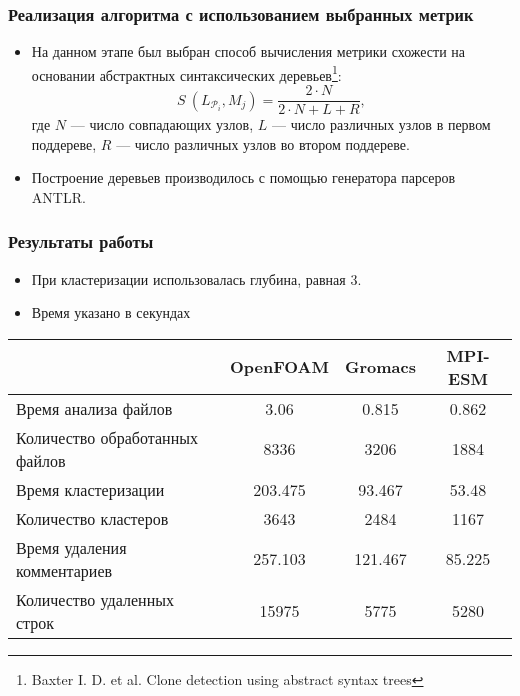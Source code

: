 \documentclass{beamer}
\begin{document}
\begin{frame}
\frametitle{Реализация алгоритма с использованием выбранных метрик}
\begin{itemize}
	\item На данном этапе был выбран способ вычисления метрики схожести на основании  абстрактных синтаксических деревьев\footnote[1]{Baxter I. D. et al. Clone detection using abstract syntax trees}:
\begin{equation}
S ~ (L_{\mathcal{P}_i}, M_j) = \frac{2 \cdot N}{2 \cdot N + L + R},
\end{equation}
где $N$ — число совпадающих узлов, $L$ — число различных узлов в первом поддереве, $R$ — число различных узлов во втором поддереве.
	\item Построение деревьев производилось с помощью генератора парсеров ANTLR.
\end{itemize}

\end{frame}



\begin{frame}
\frametitle{Результаты работы}
\begin{itemize}
	\item При кластеризации использовалась глубина, равная 3.
	\item Время указано в секундах	
\end{itemize}
\begin{small}	
\renewcommand{\arraystretch}{1.2} %
\renewcommand{\tabcolsep}{0.3cm} 
\begin{tabular}{|p{3.8cm}|c|c|c|}
\hline
 & OpenFOAM &  Gromacs & MPI-ESM\\
\hline
Время анализа файлов & 3.06 & 0.815 & 0.862\\
\hline
Количество \newline обработанных файлов & 8336 & 3206 & 1884 \\
\hline
Время кластеризации  & 203.475 & 93.467 & 53.48\\
\hline
Количество кластеров & 3643 & 2484 & 1167\\
\hline
Время \newline удаления комментариев & 257.103 & 121.467 & 85.225\\
\hline
Количество удаленных строк & 15975 & 5775 & 5280\\
\hline
\end{tabular}
\end{small}
\end{frame}
\end{document}

